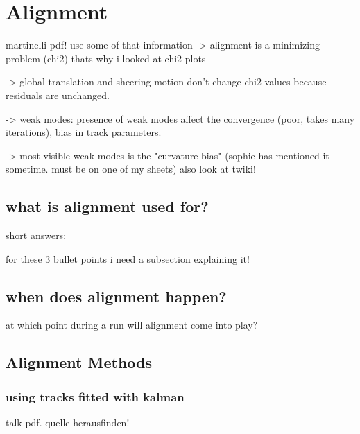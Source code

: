 
\chapter{Alignment}
\label{sec:alignment}
martinelli pdf! use some of that information
-> alignment is a minimizing problem (chi2) thats why i looked at chi2 plots

-> global translation and sheering motion don't change chi2 values because residuals are unchanged.

-> weak modes: presence of weak modes affect the convergence (poor, takes many iterations), bias in track parameters.

-> most visible weak modes is the "curvature bias" (sophie has mentioned it sometime. must be on one of my sheets)
also look at twiki!
\section{what is alignment used for?}
short answers:

for these 3 bullet points i need a subsection explaining it!

\section{when does alignment happen?}
at which point during a run will alignment come into play?

\section{Alignment Methods}

\subsection{using tracks fitted with kalman}
talk pdf. quelle herausfinden!
